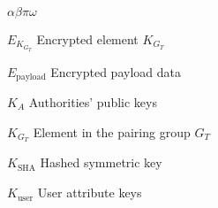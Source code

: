 \begin{listofsymbols}{$\alpha\beta\pi\omega$}
    \item[$E_{K_{G_T}}$] Encrypted element $K_{G_T}$
    \item[$E_{\text{payload}}$] Encrypted payload data
    \item[$K_A$] Authorities' public keys
    \item[$K_{G_T}$] Element in the pairing group $G_T$
    \item[$K_{\text{SHA}}$] Hashed symmetric key
    \item[$K_{\text{user}}$] User attribute keys
\end{listofsymbols}